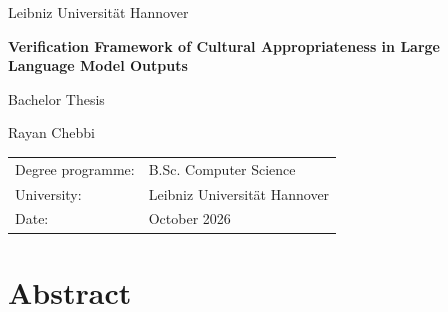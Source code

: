 \documentclass[12pt,a4paper]{report}
\begin{document}
\begin{titlepage}
\centering
\vspace*{2cm}
{\Large Leibniz Universität Hannover\par}
\vspace{1cm}
{\huge\bfseries Verification Framework of Cultural Appropriateness in Large Language Model Outputs\par}
\vspace{1.5cm}
{\Large Bachelor Thesis\par}
\vspace{1.5cm}
{\large Rayan Chebbi\par}
\vfill
\begin{tabular}{ll}
Degree programme: & B.Sc. Computer Science \\
University: & Leibniz Universität Hannover \\
Date: & October 2026 \\
\end{tabular}
\vfill
\end{titlepage}
\chapter*{Abstract}

\tableofcontents
\listoffigures
\listoftables
\clearpage
{}










\appendix





\printbibliography
\end{document}
